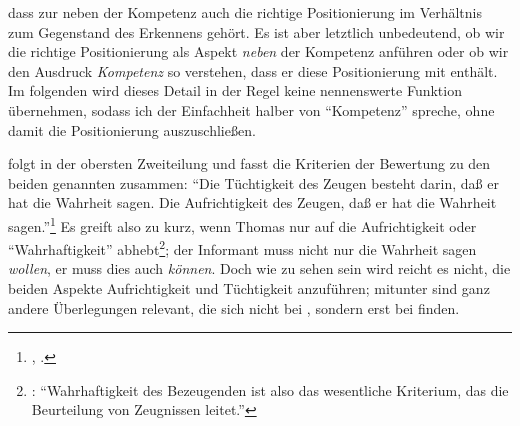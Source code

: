 dass zur  neben der Kompetenz auch die richtige
Positionierung im Verhältnis zum Gegenstand des Erkennens gehört. Es ist aber
letztlich unbedeutend, ob wir die richtige Positionierung als Aspekt
\emph{neben} der Kompetenz anführen oder ob wir den Ausdruck \emph{Kompetenz} so
verstehen, dass er diese Positionierung mit enthält. Im folgenden wird dieses
Detail in der Regel keine nennenswerte Funktion übernehmen, sodass ich der
Einfachheit halber von \enquote{Kompetenz} spreche, ohne damit die
Positionierung auszuschließen.

 folgt  in der obersten
Zweiteilung und fasst die Kriterien der Bewertung zu den beiden genannten zusammen: \enquote{Die
Tüchtigkeit des Zeugen besteht darin, daß er hat  die Wahrheit
sagen. \punkt{} Die
Aufrichtigkeit des Zeugen, daß er hat  die Wahrheit
sagen.}\footnote{\cite{Kant:WienerLogik1966}, \cite[][XXIV: 898.3--4,
20--21]{Kant:GesammelteWerke1900ff.}.} Es greift also zu kurz, wenn Thomas
  nur auf die
Aufrichtigkeit oder \enquote{Wahrhaftigkeit}
abhebt\footnote{\cite[Vgl.][145]{Kater:PolitikRechtGeschichte1999}:
\enquote{Wahrhaftigkeit des Bezeugenden ist also das wesentliche Kriterium, das
die Beurteilung von Zeugnissen leitet.}}; der Informant muss nicht nur die
Wahrheit sagen \emph{wollen}, er muss dies auch \emph{können}. Doch wie zu
sehen sein wird reicht es nicht, die beiden Aspekte Aufrichtigkeit und
Tüchtigkeit anzuführen; mitunter sind ganz andere Überlegungen relevant, die
sich nicht bei , sondern erst bei
finden.


